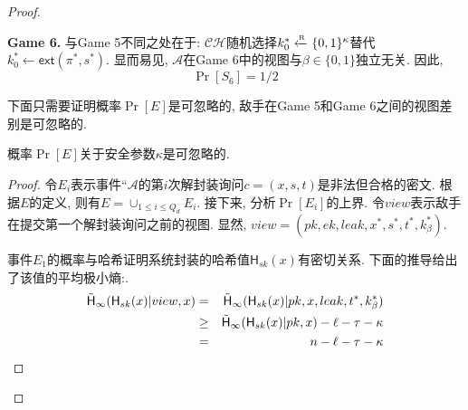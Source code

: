\begin{proof}
\begin{trivlist}
\item \textbf{Game 6.} 与Game 5不同之处在于: $\mathcal{CH}$随机选择$k_0^* \xleftarrow{\textup{\tiny R}} \{0,1\}^\kappa$替代$k_0^* \leftarrow \mathsf{ext}(\pi^*, s^*)$. 显而易见, $\mathcal{A}$在Game 6中的视图与$\beta \in \{0,1\}$独立无关. 因此,
\begin{equation*}
    \Pr[S_6] = 1/2
\end{equation*}
\end{trivlist}

下面只需要证明概率$\Pr[E]$是可忽略的, 敌手在Game 5和Game 6之间的视图差别是可忽略的.

\begin{lemma}
   概率$\Pr[E]$关于安全参数$\kappa$是可忽略的.
\end{lemma}
\begin{proof}
令$E_i$表示事件``$\mathcal{A}$的第$i$次解封装询问$c = (x, s, t)$是非法但合格的密文. 
根据$E$的定义, 则有$E = \cup_{1 \leq i \leq Q_d}E_i$. 
接下来, 分析$\Pr[E_i]$的上界. 令$view$表示敌手在提交第一个解封装询问之前的视图. 显然, $view = (pk, ek, leak, x^*, s^*, t^*, k_\beta^*)$. 

事件$E_1$的概率与哈希证明系统封装的哈希值$\mathsf{H}_{sk}(x)$有密切关系. 下面的推导给出了该值的平均极小熵:.
\begin{eqnarray}
\tilde{\mathsf{H}}_\infty(\mathsf{H}_{sk}(x)|view, x) & = & \tilde{\mathsf{H}}_\infty(\mathsf{H}_{sk}(x)|pk, x, leak, t^*, k_\beta^*) \label{eqn:ch5-KEM-1} \\ 
                    & \geq & \tilde{\mathsf{H}}_\infty(\mathsf{H}_{sk}(x)|pk, x) - \ell - \tau - \kappa \label{eqn:ch5-KEM-2} \\ 
                    & = & n - \ell - \tau - \kappa \label{eqn:ch5-KEM-3}
\end{eqnarray}


\end{proof}
\end{proof}
